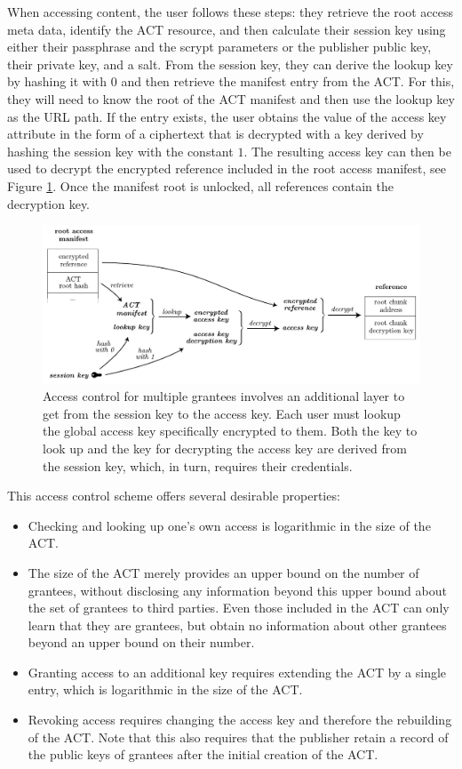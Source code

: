 When accessing content, the user follows these steps: they retrieve the root access meta data, identify the ACT resource, and then calculate their session key using either their passphrase and the scrypt parameters or the publisher public key, their private key, and a salt. From the session key, they can derive the lookup key by hashing it with $0$ and then retrieve the manifest entry from the ACT. For this, they will need to know the root of the ACT manifest and then use the lookup key as the URL path. If the entry exists, the user obtains the value of the access key attribute in the form of a ciphertext that is decrypted with a key derived by hashing the session key with the constant $1$. The resulting access key can then be used to decrypt the encrypted reference included in the root access manifest, see Figure \ref{fig:access-control-multiple-party}. Once the manifest root is unlocked, all references contain the decryption key.

\begin{figure}[htbp]
\centering
\includegraphics[width=\textwidth]{fig/access-control-multiple-party.pdf}
\caption[Access control for multiple grantees \statusyellow]{Access control for multiple grantees involves an additional layer to get from the session key to the access key. Each user must lookup the global access key specifically encrypted to them. Both the key to look up and the key for decrypting the access key are derived from the session key, which, in turn, requires their credentials.} 
\label{fig:access-control-multiple-party}
\end{figure}


This access control scheme offers several desirable properties:
\begin{itemize}
\item Checking and looking up one's own access is logarithmic in the size of the ACT.
\item The size of the ACT merely provides an upper bound on the number of grantees, without disclosing any information beyond this upper bound about the set of grantees to third parties. Even those included in the ACT can only learn that they are grantees, but obtain no information about other grantees beyond an upper bound on their number.
\item Granting access to an additional key requires extending the ACT by a single entry, which is logarithmic in the size of the ACT. 
\item Revoking access requires changing the access key and therefore the rebuilding of the ACT. Note that this also requires that the publisher retain a record of the public keys of grantees after the initial creation of the ACT.
\end{itemize}

